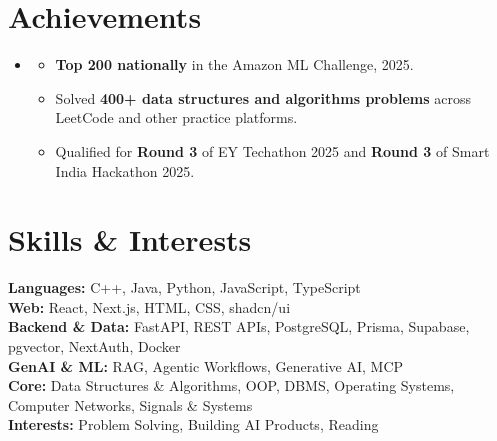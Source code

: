 \documentclass[letterpaper,11pt]{article}
\newcommand{\resumeSubHeadingListStart}{\begin{itemize}[leftmargin=0.0in, label={}]}
\newcommand{\resumeSubHeadingListEnd}{\end{itemize}}
\begin{document}
\section{Achievements}
\resumeSubHeadingListStart
\item[]
\begin{itemize}[leftmargin=0.15in, itemsep=1pt, topsep=2pt]
  \small
  \item \textbf{Top 200 nationally} in the Amazon ML Challenge, 2025.
  \item Solved \textbf{400+ data structures and algorithms problems} across LeetCode and other practice platforms.
  \item Qualified for \textbf{Round 3} of EY Techathon 2025 and \textbf{Round 3} of Smart India Hackathon 2025.
\end{itemize}
\resumeSubHeadingListEnd
\vspace{-6pt}

\section{Skills \& Interests}
\small{
\textbf{Languages:} C++, Java, Python, JavaScript, TypeScript \\
\textbf{Web:} React, Next.js, HTML, CSS, shadcn/ui \\
\textbf{Backend \& Data:} FastAPI, REST APIs, PostgreSQL, Prisma, Supabase, pgvector, NextAuth, Docker \\
\textbf{GenAI \& ML:} RAG, Agentic Workflows, Generative AI, MCP \\
\textbf{Core:} Data Structures \& Algorithms, OOP, DBMS, Operating Systems, Computer Networks, Signals \& Systems \\
\textbf{Interests:} Problem Solving, Building AI Products, Reading
}
\end{document}
